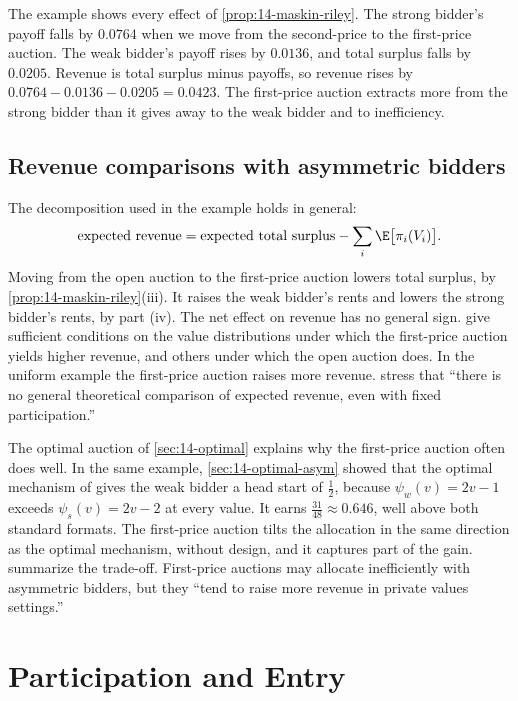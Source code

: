 The example shows every effect of \cref{prop:14-maskin-riley}. The strong bidder's payoff falls by
$0.0764$ when we move from the second-price to the first-price auction. The weak bidder's payoff
rises by $0.0136$, and total surplus falls by $0.0205$. Revenue is total surplus minus payoffs, so
revenue rises by $0.0764-0.0136-0.0205=0.0423$. The first-price auction extracts more from the strong
bidder than it gives away to the weak bidder and to inefficiency.

\subsection{Revenue comparisons with asymmetric bidders}\label{sec:14-asym-revenue}

The decomposition used in the example holds in general:
\begin{equation}\label{eq:14-rev-decomp}
\text{expected revenue}=\text{expected total surplus}-\sum_i\E\bigl[\pi_i(V_i)\bigr].
\end{equation}
Moving from the open auction to the first-price auction lowers total surplus, by
\cref{prop:14-maskin-riley}(iii). It raises the weak bidder's rents and lowers the strong bidder's
rents, by part (iv). The net effect on revenue has no general sign.
\citet{MaskinRiley2000} give sufficient conditions on the value distributions under which the
first-price auction yields higher revenue, and others under which the open auction does. In the
uniform example the first-price auction raises more revenue. \citet[Section II.D]{AtheyLevinSeira2011} stress that ``there is no general theoretical
comparison of expected revenue, even with fixed participation.''

The optimal auction of \cref{sec:14-optimal} explains why the first-price auction often does well.
In the same example, \cref{sec:14-optimal-asym} showed that the optimal mechanism of
\citet{Myerson1981} gives the weak bidder a head start of $\frac{1}{2}$, because $\psi_w(v)=2v-1$
exceeds $\psi_s(v)=2v-2$ at every value. It earns $\frac{31}{48}\approx 0.646$, well above both
standard formats. The first-price auction tilts the allocation in the same direction as the optimal
mechanism, without design, and it captures part of the gain.
\citet[Section 7]{AtheyHaile2007} summarize the trade-off. First-price auctions may allocate
inefficiently with asymmetric bidders, but they ``tend to raise more revenue in private values
settings.''

\section{Participation and Entry}\label{sec:14-entry}

